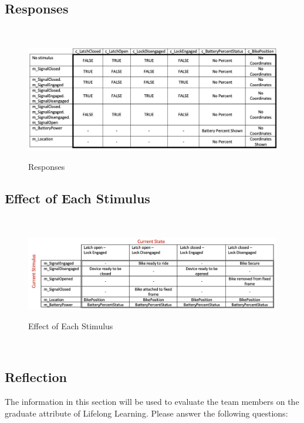 \documentclass[12pt]{article}
\begin{document}
\subsection{Responses}
~\newline
\begin{figure}[h!]
 \begin{center}
 {
 \includegraphics[width=0.9\linewidth]{./Responses.jpeg}
 }
 \caption{\label{Responses} Responses}
 \end{center}
 \end{figure}
\subsection{Effect of Each Stimulus}
~\newline
\begin{figure}[h!]
 \begin{center}
 {
 \includegraphics[width=0.9\linewidth]{./EffectofEachStimulus.jpeg}
 }
 \caption{\label{Effect of Each Stimulus} Effect of Each Stimulus}
 \end{center}
 \end{figure}
~\newpage
\subsection{Reflection}

The information in this section will be used to evaluate the team members on the
graduate attribute of Lifelong Learning.  Please answer the following questions:
\end{document}
